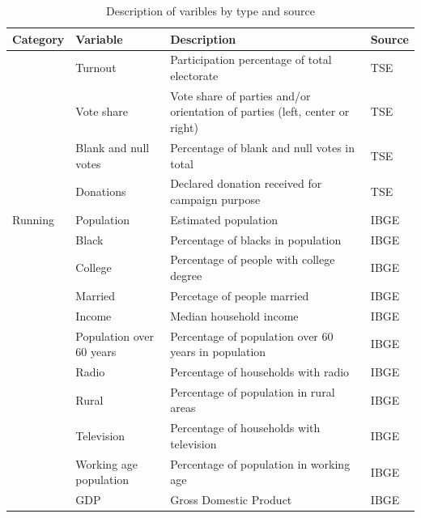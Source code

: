 \documentclass[
  12pt,
]{article}
\begin{document}
\begin{table}[H]

\caption{\label{tab:variables}Description of varibles by type and source}
\centering
\fontsize{9}{11}\selectfont
\begin{tabu} to 
\toprule
Category & Variable & Description & Source\\
\midrule
 & Turnout & Participation percentage of total electorate & TSE\\

 & Vote share & Vote share of parties and/or orientation of parties (left, center or right) & TSE\\

 & Blank and null votes & Percentage of blank and null votes in total & TSE\\

 & Donations & Declared donation received for campaign purpose & TSE\\
Running & Population & Estimated population & IBGE\\
 & Black & Percentage of blacks in population & IBGE\\

 & College & Percentage of people with college degree & IBGE\\

 & Married & Percetage of people married & IBGE\\

 & Income & Median household income & IBGE\\

 & Population over 60 years & Percentage of population over 60 years in population & IBGE\\

 & Radio & Percentage of households with radio & IBGE\\

 & Rural & Percentage of population in rural areas & IBGE\\

 & Television & Percentage of households with television & IBGE\\

 & Working age population & Percentage of population in working age & IBGE\\

 & GDP & Gross Domestic Product & IBGE\\


\end{tabu}
\end{table}
\end{document}

